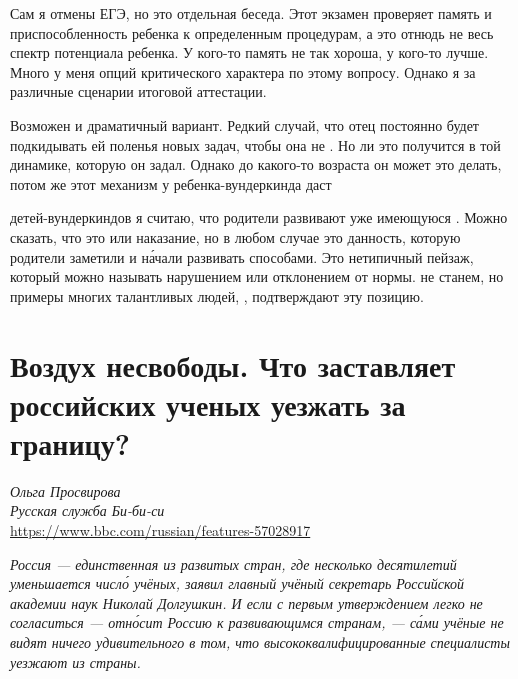 Сам я  отмены ЕГЭ, но это отдельная беседа. Этот экзамен проверяет память и приспособленность ребенка к определенным процедурам, а это отнюдь не весь спектр потенциала ребенка. У кого-то память не так хороша, у кого-то лучше. Много у меня опций критического характера по этому вопросу. Однако я за различные сценарии итоговой аттестации.

\begin{fancyquotes}
    Возможен и драматичный вариант. Редкий случай, что отец постоянно будет подкидывать ей поленья новых задач, чтобы она не . Но  ли это получится в той динамике, которую он задал. Однако до какого-то возраста он может это делать, потом же этот механизм у ребенка-вундеркинда даст 
\end{fancyquotes}

 детей-вундеркиндов я считаю, что родители развивают уже имеющуюся . Можно сказать, что это  или наказание, но в любом случае это данность, которую родители заметили и н\'{а}чали развивать  способами. Это нетипичный пейзаж, который можно называть  нарушением или отклонением от нормы.  не станем, но примеры многих талантливых людей, , подтверждают эту позицию.




\section[Воздух несвободы]{Воздух несвободы. Что заставляет российских ученых уезжать за границу?}
\textit{Ольга Просвирова}\\
\textit{Русская служба Би-би-си}\\
\url{https://www.bbc.com/russian/features-57028917}

\textit{Россия --- единственная из развитых стран, где несколько десятилетий  уменьшается числ\'{о} учёных, заявил главный учёный секретарь Российской академии наук Николай Долгушкин. И если с первым утверждением легко не согласиться ---  отн\'{о}сит Россию к развивающимся странам, --- с\'{а}ми учёные не видят ничего удивительного в том, что высококвалифицированные специалисты уезжают из страны.}

